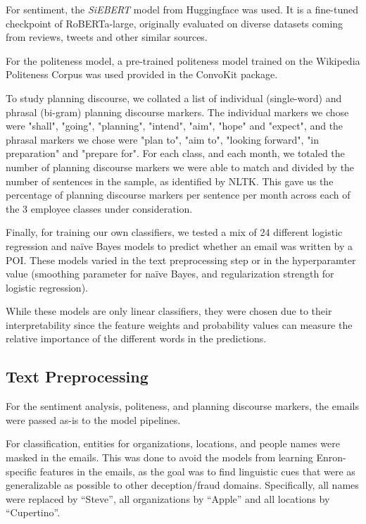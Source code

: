 For sentiment, the \textit{SiEBERT} \cite{sentimentModel} model from Huggingface was used. It is a fine-tuned checkpoint of RoBERTa-large, originally evaluated on diverse datasets coming from reviews, tweets and other similar sources. 

For the politeness model, a pre-trained politeness model trained on the Wikipedia Politeness Corpus was used provided in the ConvoKit package.

To study planning discourse, we collated a list of individual (single-word) and phrasal (bi-gram) planning discourse markers. The individual markers we chose were "shall", "going", "planning", "intend", "aim", "hope" and "expect", and the phrasal markers we chose were "plan to", "aim to", "looking forward", "in preparation" and "prepare for". For each class, and each month, we totaled the number of planning discourse markers we were able to match and divided by the number of sentences in the sample, as identified by NLTK. This gave us the percentage of planning discourse markers per sentence per month across each of the 3 employee classes under consideration.

Finally, for training our own classifiers, we tested a mix of 24 different logistic regression and naïve Bayes models to predict whether an email was written by a POI. These models varied in the text preprocessing step or in the hyperparamter value (smoothing parameter for naïve Bayes, and regularization strength for logistic regression). 

While these models are only linear classifiers, they were chosen due to their interpretability since the feature weights and probability values can measure the relative importance of the different words in the predictions.


\subsection{Text Preprocessing}


For the sentiment analysis, politeness, and planning discourse markers, the emails were passed as-is to the model pipelines. 

For classification, entities for organizations, locations, and people names were masked in the emails. This was done to avoid the models from learning Enron-specific features in the emails, as the goal was to find linguistic cues that were as generalizable as possible to other deception/fraud domains. Specifically, all names were replaced by ``Steve'', all organizations by ``Apple'' and all locations by ``Cupertino''.

